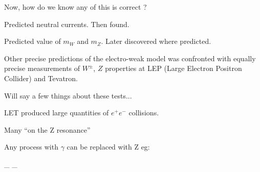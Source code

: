 {\lineacross

Now, how do we know any of this is correct ?
\bi
\item[-] Predicted neutral currents.  Then found.
\item[-] Predicted value of $m_W$ and $m_Z$.  Later discovered where predicted.
\ei

Other precise predictions of the electro-weak model was confronted with equally precise measurements of $W^\pm$, $Z$ properties at LEP (Large Electron Positron Collider) and Tevatron. 

Will say a few things about these tests...

\clearpage

LET produced large quantities of $e^+e^-$ collisions. 

Many ``on the Z resonance''

Any process with $\gamma$ can be replaced with Z
eg:

\be
{}_{}
\hspace*{0.5in}
_{}
\ee

}
